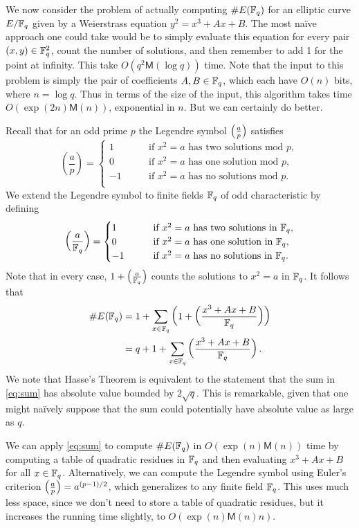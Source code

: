 We now consider the problem of actually computing $\#E(\mathbb{F}_q)$ for an elliptic curve $E/\mathbb{F}_q$ given by a Weierstrass equation $y^2=x^3+Ax+B$.
The most na\"ive approach one could take would be to simply evaluate this equation for every pair $(x,y)\in\mathbb{F}_q^2$, count the number of solutions, and then remember to add 1 for the point at infinity.  This take $O(q^2\textsf{M}(\log q))$ time.
Note that the input to this problem is simply the pair of coefficients $A,B\in\mathbb{F}_q$, which each have $O(n)$ bits, where $n=\log q$.
Thus in terms of the size of the input, this algorithm takes time $O(\exp (2n) \textsf{M}(n))$, exponential in $n$.
But we can certainly do better.

Recall that for an odd prime $p$ the Legendre symbol $\left( {\frac{a}{p}} \right)$ satisfies
\[
\left(\frac{a}{p}\right) =
\begin{cases}
1\qquad&\text{if $x^2=a$ has two solutions mod $p$},\\
0\qquad&\text{if $x^2=a$ has one solution mod $p$},\\
-1\qquad&\text{if $x^2=a$ has no solutions mod $p$}.\\
\end{cases}
\]
We extend the Legendre symbol to finite fields $\mathbb{F}_q$ of odd characteristic by defining
\[
\left(\frac{a}{\mathbb{F}_q}\right) =
\begin{cases}
1\qquad&\text{if $x^2=a$ has two solutions in $\mathbb{F}_q$},\\
0\qquad&\text{if $x^2=a$ has one solution in $\mathbb{F}_q$},\\
-1\qquad&\text{if $x^2=a$ has no solutions in $\mathbb{F}_q$}.\\
\end{cases}
\]
Note that in every case, $1+\left( {\frac{a}{\mathbb{F}_q}} \right)$ counts the solutions to $x^2=a$ in $\mathbb{F}_q$.  It follows that
\begin{align}\notag
\#E(\mathbb{F}_q) &= 1 + \sum_{x\in\mathbb{F}_q} \left(1 + \left(\frac{x^3+Ax+B}{\mathbb{F}_q}\right)\right)\\
&= q+1+\sum_{x\in\mathbb{F}_q} \left(\frac{x^3+Ax+B}{\mathbb{F}_q}\right).\label{eq:sum}
\end{align}
We note that Hasse's Theorem is equivalent to the statement that the sum in \eqref{eq:sum} has absolute value bounded by $2\sqrt{q}$.
This is remarkable, given that one might na\"ively suppose that the sum could potentially have absolute value as large as $q$.

We can apply \eqref{eq:sum} to compute $\#E(\mathbb{F}_q)$ in $O(\exp(n)\textsf{M}(n))$ time by computing a table of quadratic residues in $\mathbb{F}_q$ and then evaluating $x^3+Ax+B$ for all $x\in\mathbb{F}_q$.  Alternatively, we can compute the Legendre symbol using Euler's criterion $\left( {\frac{a}{p}} \right)=a^{(p-1)/2}$, which generalizes to any finite field $\mathbb{F}_q$.
This uses much less space, since we don't need to store a table of quadratic residues, but it increases the running time slightly, to $O(\exp(n)\textsf{M}(n)n)$.

